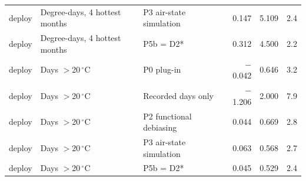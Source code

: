 \begin{table}
{\begin{tabular}{lllrrr}
deploy & Degree-days, 4 hottest months & P3 air-state simulation & 0.147 & 5.109 & 2.4 \\
deploy & Degree-days, 4 hottest months & P5b = D2* & 0.312 & 4.500 & 2.2 \\
deploy & Days $>$20\,$^{\circ}$C & P0 plug-in & \ensuremath{-}0.042 & 0.646 & 3.2 \\
deploy & Days $>$20\,$^{\circ}$C & Recorded days only & \ensuremath{-}1.206 & 2.000 & 7.9 \\
deploy & Days $>$20\,$^{\circ}$C & P2 functional debiasing & 0.044 & 0.669 & 2.8 \\
deploy & Days $>$20\,$^{\circ}$C & P3 air-state simulation & 0.063 & 0.568 & 2.7 \\
deploy & Days $>$20\,$^{\circ}$C & P5b = D2* & 0.045 & 0.529 & 2.4 \\
\bottomrule
\end{tabular}
}
\end{table}

